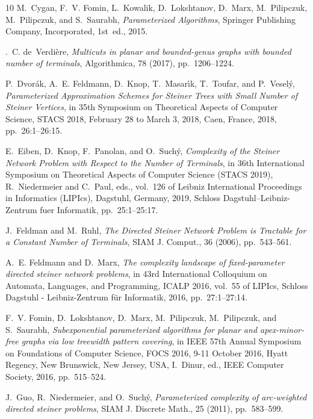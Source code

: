 \documentclass[a4paper,11pt]{article}
\theoremstyle{plain}
\newtheorem{identification rule}{Identification Rule}
\theoremstyle{definition}
\theoremstyle{remark}
\begin{document}
\begin{thebibliography}{10}
{\sc M.~Cygan, F.~V. Fomin, L.~Kowalik, D.~Lokshtanov, D.~Marx, M.~Pilipczuk,
  M.~Pilipczuk, and S.~Saurabh}, {\em Parameterized Algorithms}, Springer
  Publishing Company, Incorporated, 1st~ed., 2015.

{.~C. de~Verdi{\`{e}}re}, {\em Multicuts in planar and bounded-genus
  graphs with bounded number of terminals}, Algorithmica, 78 (2017),
  pp.~1206--1224.

{\sc P.~Dvor{\'{a}}k, A.~E. Feldmann, D.~Knop, T.~Masar{\'{\i}}k, T.~Toufar,
  and P.~Vesel{\'{y}}}, {\em {Parameterized Approximation Schemes for Steiner
  Trees with Small Number of Steiner Vertices}}, in 35th Symposium on
  Theoretical Aspects of Computer Science, {STACS} 2018, February 28 to March
  3, 2018, Caen, France, 2018, pp.~26:1--26:15.

{\sc E.~Eiben, D.~Knop, F.~Panolan, and O.~Such{\'y}}, {\em {Complexity of the
  Steiner Network Problem with Respect to the Number of Terminals}}, in 36th
  International Symposium on Theoretical Aspects of Computer Science (STACS
  2019), R.~Niedermeier and C.~Paul, eds., vol.~126 of Leibniz International
  Proceedings in Informatics (LIPIcs), Dagstuhl, Germany, 2019, Schloss
  Dagstuhl--Leibniz-Zentrum fuer Informatik, pp.~25:1--25:17.

{\sc J.~Feldman and M.~Ruhl}, {\em {The Directed Steiner Network Problem is
  Tractable for a Constant Number of Terminals}}, {SIAM} J. Comput., 36 (2006),
  pp.~543--561.

{\sc A.~E. Feldmann and D.~Marx}, {\em The complexity landscape of
  fixed-parameter directed steiner network problems}, in 43rd International
  Colloquium on Automata, Languages, and Programming, {ICALP} 2016, vol.~55 of
  LIPIcs, Schloss Dagstuhl - Leibniz-Zentrum f{\"{u}}r Informatik, 2016,
  pp.~27:1--27:14.

{\sc F.~V. Fomin, D.~Lokshtanov, D.~Marx, M.~Pilipczuk, M.~Pilipczuk, and
  S.~Saurabh}, {\em Subexponential parameterized algorithms for planar and
  apex-minor-free graphs via low treewidth pattern covering}, in {IEEE} 57th
  Annual Symposium on Foundations of Computer Science, {FOCS} 2016, 9-11
  October 2016, Hyatt Regency, New Brunswick, New Jersey, {USA}, I.~Dinur, ed.,
  {IEEE} Computer Society, 2016, pp.~515--524.

{\sc J.~Guo, R.~Niedermeier, and O.~Such{\'{y}}}, {\em Parameterized complexity
  of arc-weighted directed steiner problems}, {SIAM} J. Discrete Math., 25
  (2011), pp.~583--599.


\end{thebibliography}
\end{document}
